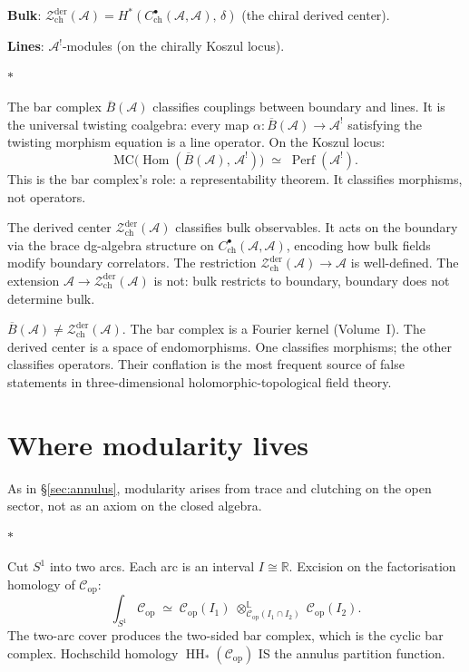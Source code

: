\documentclass[11pt]{article}
\newcommand{\cA}{\mathcal{A}}
\newcommand{\cC}{\mathcal{C}}
\newcommand{\cZ}{\mathcal{Z}}
\newcommand{\barB}{\overline{B}}
\newcommand{\R}{\mathbb{R}}
\newcommand{\MC}{\mathrm{MC}}
\newcommand{\Hom}{\operatorname{Hom}}
\newcommand{\HH}{\operatorname{HH}}
\newcommand{\Perf}{\operatorname{Perf}}
\newcommand{\Zder}{\cZ^{\mathrm{der}}_{\mathrm{ch}}}
\newcommand{\sep}{\bigskip\begin{center}$*$\end{center}\medskip}
\begin{document}
\noindent
\textbf{Bulk}: $\Zder(\cA) = H^*(C^\bullet_{\mathrm{ch}}(\cA,\cA),\,\delta)$
(the chiral derived center).

\noindent
\textbf{Lines}: $\cA^!$-modules (on the chirally Koszul locus).

\sep

The bar complex $\barB(\cA)$ classifies couplings between boundary
and lines.  It is the universal twisting coalgebra: every map
$\alpha\colon \barB(\cA) \to \cA^!$ satisfying the twisting
morphism equation is a line operator.  On the Koszul locus:
\[
\MC\bigl(\Hom(\barB(\cA),\, \cA^!)\bigr)
\;\simeq\;
\Perf(\cA^!).
\]
This is the bar complex's role: a representability theorem.  It
classifies morphisms, not operators.

The derived center $\Zder(\cA)$ classifies bulk observables.
It acts on the boundary via the brace dg-algebra structure
on $C^\bullet_{\mathrm{ch}}(\cA,\cA)$, encoding how bulk fields
modify boundary correlators.  The
restriction $\Zder(\cA) \to \cA$ is well-defined.  The extension
$\cA \to \Zder(\cA)$ is not: bulk restricts to boundary, boundary
does not determine bulk.

\begin{warning}
$\barB(\cA) \neq \Zder(\cA)$.  The bar complex is a Fourier
kernel (Volume~I).  The derived center is a space of
endomorphisms.  One classifies morphisms; the other classifies
operators.  Their conflation is the most frequent source of false
statements in three-dimensional holomorphic-topological field
theory.
\end{warning}


\section{Where modularity lives}
\label{sec:where-modularity-lives}

As in \S\ref{sec:annulus}, modularity arises from trace and
clutching on the open sector, not as an axiom on the closed algebra.

\sep

Cut $S^1$ into two arcs.  Each arc is an interval $I \cong \R$.
Excision on the factorisation homology of $\cC_{\mathrm{op}}$:
\[
\int_{S^1}\!\cC_{\mathrm{op}}
\;\simeq\;
\cC_{\mathrm{op}}(I_1)
\;\otimes_{\cC_{\mathrm{op}}(I_1 \cap I_2)}^{\mathbb{L}}\;
\cC_{\mathrm{op}}(I_2).
\]
The two-arc cover produces the two-sided bar complex, which is the
cyclic bar complex.  Hochschild homology
$\HH_*(\cC_{\mathrm{op}})$ IS the annulus partition function.
\end{document}
